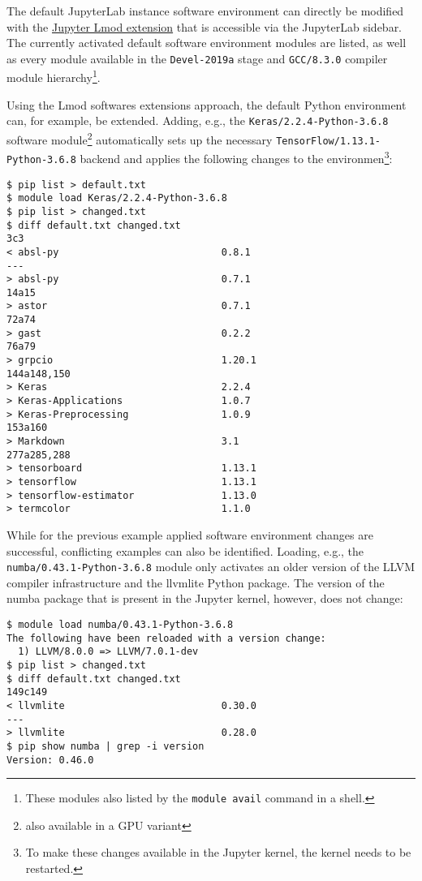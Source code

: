 \documentclass[11pt,a4paper]{article}
\begin{document}
The default JupyterLab instance software environment can directly be modified with the \href{https://github.com/cmd-ntrf/jupyter-lmod}{Jupyter Lmod extension} that is accessible via the JupyterLab sidebar.
The currently activated default software environment modules are listed, as well as every module available in the \verb|Devel-2019a| stage and \verb|GCC/8.3.0| compiler module hierarchy\cprotect\footnote{These modules also listed by the \verb|module avail| command in a shell.}.

Using the Lmod softwares extensions approach, the default Python environment can, for example, be extended.
Adding, e.g., the \verb|Keras/2.2.4-Python-3.6.8| software module\footnote{also available in a GPU variant} automatically sets up the necessary \verb|TensorFlow/1.13.1-Python-3.6.8| backend and applies the following changes to the environmen\footnote{To make these changes available in the Jupyter kernel, the kernel needs to be restarted.}:
%
\begin{verbatim}
$ pip list > default.txt
$ module load Keras/2.2.4-Python-3.6.8
$ pip list > changed.txt
$ diff default.txt changed.txt
3c3
< absl-py                            0.8.1
---
> absl-py                            0.7.1
14a15
> astor                              0.7.1
72a74
> gast                               0.2.2
76a79
> grpcio                             1.20.1
144a148,150
> Keras                              2.2.4
> Keras-Applications                 1.0.7
> Keras-Preprocessing                1.0.9
153a160
> Markdown                           3.1
277a285,288
> tensorboard                        1.13.1
> tensorflow                         1.13.1
> tensorflow-estimator               1.13.0
> termcolor                          1.1.0
\end{verbatim}

While for the previous example applied software environment changes are successful, conflicting examples can also be identified.
Loading, e.g., the \verb|numba/0.43.1-Python-3.6.8| module only activates an older version of the LLVM compiler infrastructure and the llvmlite Python package. The version of the numba package that is present in the Jupyter kernel, however, does not change:
%
\begin{verbatim}
$ module load numba/0.43.1-Python-3.6.8
The following have been reloaded with a version change:
  1) LLVM/8.0.0 => LLVM/7.0.1-dev
$ pip list > changed.txt
$ diff default.txt changed.txt
149c149
< llvmlite                           0.30.0
---
> llvmlite                           0.28.0
$ pip show numba | grep -i version
Version: 0.46.0
\end{verbatim}
\end{document}
